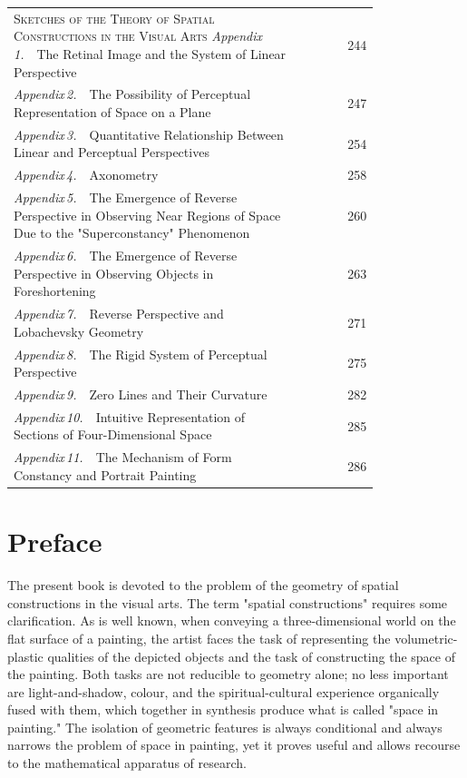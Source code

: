 \begin{center}
\begin{tabular}{@{}p{0.80\linewidth}r@{}}{\textsc{Sketches of the Theory of Spatial Constructions in the Visual Arts}}
    \textit{Appendix\,1.}\ \ The Retinal Image and the System
      of Linear Perspective  &  244 \\[0.4em]
    \textit{Appendix\,2.}\ \ The Possibility of Perceptual Representation
      of Space on a Plane  &  247 \\[0.4em]
    \textit{Appendix\,3.}\ \ Quantitative Relationship Between Linear
      and Perceptual Perspectives  &  254 \\[0.4em]
    \textit{Appendix\,4.}\ \ Axonometry  &  258 \\[0.4em]
    \textit{Appendix\,5.}\ \ The Emergence of Reverse Perspective
      in Observing Near Regions of Space Due to
      the "Superconstancy" Phenomenon  &  260 \\[0.4em]
    \textit{Appendix\,6.}\ \ The Emergence of Reverse Perspective
      in Observing Objects in Foreshortening  &  263 \\[0.4em]
    \textit{Appendix\,7.}\ \ Reverse Perspective and Lobachevsky Geometry  &  271 \\[0.4em]
    \textit{Appendix\,8.}\ \ The Rigid System of Perceptual Perspective  &  275 \\[0.4em]
    \textit{Appendix\,9.}\ \ Zero Lines and Their Curvature  &  282 \\[0.4em]
    \textit{Appendix\,10.}\ \ Intuitive Representation of Sections
      of Four-Dimensional Space  &  285 \\[0.4em]
    \textit{Appendix\,11.}\ \ The Mechanism of Form Constancy
      and Portrait Painting  &  286 \\[0.4em]
  \end{tabular}
\end{center}
\clearpage

\chapter*{Preface}

The present book is devoted to the problem of the geometry of spatial constructions in
the visual arts. The term "spatial constructions" requires some clarification. As is well
known, when conveying a three-dimensional world on the flat surface of a painting, the
artist faces the task of representing the volumetric-plastic qualities of the depicted objects
and the task of constructing the space of the painting. Both tasks are not reducible to
geometry alone; no less important are light-and-shadow, colour, and the
spiritual-cultural experience organically fused with them, which together in synthesis
produce what is called "space in painting." The isolation of geometric features is always
conditional and always narrows the problem of space in painting, yet it proves useful and
allows recourse to the mathematical apparatus of research.

